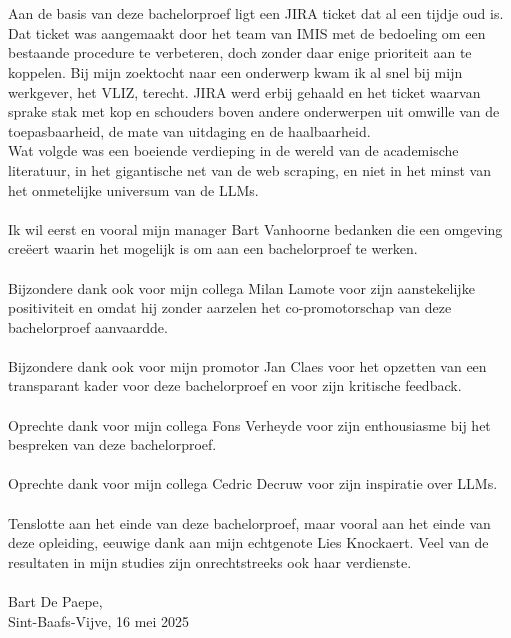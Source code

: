 
\chapter*{}%
\label{ch:voorwoord}


Aan de basis van deze bachelorproef ligt een JIRA ticket dat al een tijdje oud is. Dat ticket was aangemaakt door het team van IMIS met de bedoeling om een bestaande procedure te verbeteren, doch zonder daar enige prioriteit aan te koppelen. Bij mijn zoektocht naar een onderwerp kwam ik al snel bij mijn werkgever, het VLIZ, terecht. JIRA werd erbij gehaald en het ticket waarvan sprake stak met kop en schouders boven andere onderwerpen uit omwille van de toepasbaarheid, de mate van uitdaging en de haalbaarheid.\\
Wat volgde was een boeiende verdieping in de wereld van de academische literatuur, in het gigantische net van de web scraping, en niet in het minst van het onmetelijke universum van de LLMs.\\\\
Ik wil eerst en vooral mijn manager Bart Vanhoorne bedanken die een omgeving creëert waarin het mogelijk is om aan een bachelorproef te werken.\\\\
Bijzondere dank ook voor mijn collega Milan Lamote voor zijn aanstekelijke positiviteit en omdat hij zonder aarzelen het co-promotorschap van deze bachelorproef aanvaardde.\\\\
Bijzondere dank ook voor mijn promotor Jan Claes voor het opzetten van een transparant kader voor deze bachelorproef en voor zijn kritische feedback.\\\\
Oprechte dank voor mijn collega Fons Verheyde voor zijn enthousiasme bij het bespreken van deze bachelorproef.\\\\
Oprechte dank voor mijn collega Cedric Decruw voor zijn inspiratie over LLMs.\\\\
Tenslotte aan het einde van deze bachelorproef, maar vooral aan het einde van deze opleiding, eeuwige dank aan mijn echtgenote Lies Knockaert. Veel van de resultaten in mijn studies zijn onrechtstreeks ook haar verdienste.
\\\\
Bart De Paepe,\\
Sint-Baafs-Vijve, 16 mei 2025